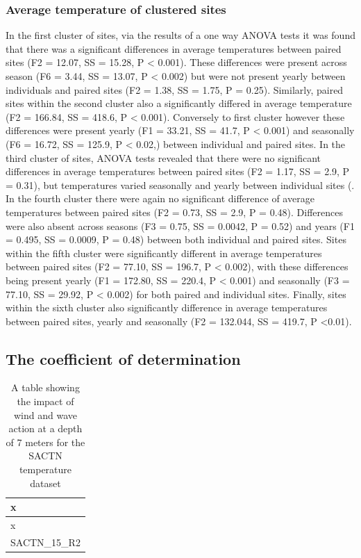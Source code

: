 \documentclass[12pt,]{article}
\begin{document}
\subsubsection{Average temperature of clustered
sites}\label{average-temperature-of-clustered-sites}

In the first cluster of sites, via the results of a one way ANOVA tests
it was found that there was a significant differences in average
temperatures between paired sites (F2 = 12.07, SS = 15.28, P \textless{}
0.001). These differences were present across season (F6 = 3.44, SS =
13.07, P \textless{} 0.002) but were not present yearly between
individuals and paired sites (F2 = 1.38, SS = 1.75, P = 0.25).
Similarly, paired sites within the second cluster also a significantly
differed in average temperature (F2 = 166.84, SS = 418.6, P \textless{}
0.001). Conversely to first cluster however these differences were
present yearly (F1 = 33.21, SS = 41.7, P \textless{} 0.001) and
seasonally (F6 = 16.72, SS = 125.9, P \textless{} 0.02,) between
individual and paired sites. In the third cluster of sites, ANOVA tests
revealed that there were no significant differences in average
temperatures between paired sites (F2 = 1.17, SS = 2.9, P = 0.31), but
temperatures varied seasonally and yearly between individual sites (. In
the fourth cluster there were again no significant difference of average
temperatures between paired sites (F2 = 0.73, SS = 2.9, P = 0.48).
Differences were also absent across seasons (F3 = 0.75, SS = 0.0042, P =
0.52) and years (F1 = 0.495, SS = 0.0009, P = 0.48) between both
individual and paired sites. Sites within the fifth cluster were
significantly different in average temperatures between paired sites (F2
= 77.10, SS = 196.7, P \textless{} 0.002), with these differences being
present yearly (F1 = 172.80, SS = 220.4, P \textless{} 0.001) and
seasonally (F3 = 77.10, SS = 29.92, P \textless{} 0.002) for both paired
and individual sites. Finally, sites within the sixth cluster also
significantly difference in average temperatures between paired sites,
yearly and seasonally (F2 = 132.044, SS = 419.7, P \textless{}0.01).

\subsection{The coefficient of
determination}\label{the-coefficient-of-determination}

\begin{longtable}[]{@{}l@{}}
\caption{A table showing the impact of wind and wave action at a depth
of 7 meters for the SACTN temperature dataset}\tabularnewline
\toprule
x\tabularnewline
\midrule
\endfirsthead
\toprule
x\tabularnewline
\midrule
\endhead
SACTN\_15\_R2\tabularnewline
\bottomrule
\end{longtable}
\end{document}
